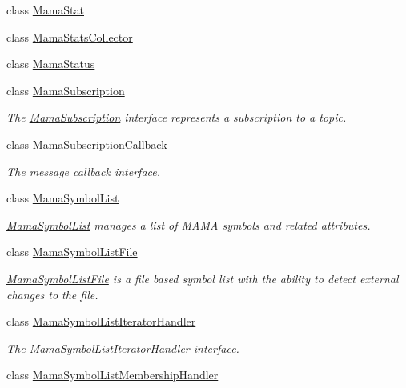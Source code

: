 \begin{DoxyCompactItemize}
class \hyperlink{classWombat_1_1MamaStat}{MamaStat}
\item 
class \hyperlink{classWombat_1_1MamaStatsCollector}{MamaStatsCollector}
\item 
class \hyperlink{classWombat_1_1MamaStatus}{MamaStatus}
\item 
class \hyperlink{classWombat_1_1MamaSubscription}{MamaSubscription}
\begin{DoxyCompactList}\small\item\em The {\ttfamily \hyperlink{classWombat_1_1MamaSubscription}{MamaSubscription}} interface represents a subscription to a topic. \item\end{DoxyCompactList}\item 
class \hyperlink{classWombat_1_1MamaSubscriptionCallback}{MamaSubscriptionCallback}
\begin{DoxyCompactList}\small\item\em The message callback interface. \item\end{DoxyCompactList}\item 
class \hyperlink{classWombat_1_1MamaSymbolList}{MamaSymbolList}
\begin{DoxyCompactList}\small\item\em \hyperlink{classWombat_1_1MamaSymbolList}{MamaSymbolList} manages a list of MAMA symbols and related attributes. \item\end{DoxyCompactList}\item 
class \hyperlink{classWombat_1_1MamaSymbolListFile}{MamaSymbolListFile}
\begin{DoxyCompactList}\small\item\em \hyperlink{classWombat_1_1MamaSymbolListFile}{MamaSymbolListFile} is a file based symbol list with the ability to detect external changes to the file. \item\end{DoxyCompactList}\item 
class \hyperlink{classWombat_1_1MamaSymbolListIteratorHandler}{MamaSymbolListIteratorHandler}
\begin{DoxyCompactList}\small\item\em The \hyperlink{classWombat_1_1MamaSymbolListIteratorHandler}{MamaSymbolListIteratorHandler} interface. \item\end{DoxyCompactList}\item 
class \hyperlink{classWombat_1_1MamaSymbolListMembershipHandler}{MamaSymbolListMembershipHandler}

\end{DoxyCompactItemize}
